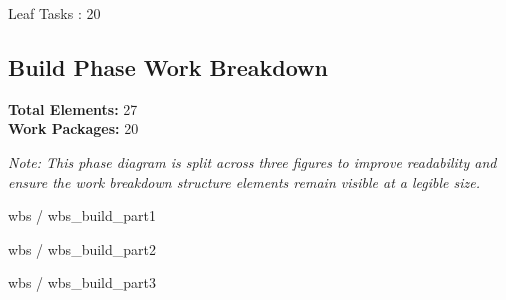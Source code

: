     Leaf Tasks : 20

\subsection {
  Build Phase Work Breakdown
}

\noindent\textbf { Total Elements: }
27
\\\textbf { Work Packages: }
20

\vspace {
  0.5em
}

\noindent\textit {
Note:
  This phase diagram is split across three figures to
      improve readability and ensure the work breakdown structure elements
          remain visible at a legible size.
}

 { wbs / wbs_build_part1 }

\newpage
 { wbs / wbs_build_part2 }

\newpage
 { wbs / wbs_build_part3 }

